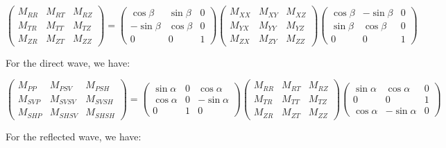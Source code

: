 \documentclass[workdone.tex]{subfiles}
\begin{document}
\begin{equation}
\begin{pmatrix}
M_{RR} & M_{RT} & M_{RZ} \\
M_{TR} & M_{TT} & M_{TZ} \\
M_{ZR} & M_{ZT} & M_{ZZ}
\end{pmatrix} = \begin{pmatrix}
\cos \beta & \sin \beta & 0 \\
- \sin \beta & \cos \beta & 0 \\
0 & 0 & 1
\end{pmatrix} \begin{pmatrix}
M_{XX} & M_{XY} & M_{XZ} \\
M_{YX} & M_{YY} & M_{YZ} \\
M_{ZX} & M_{ZY} & M_{ZZ}
\end{pmatrix} \begin{pmatrix}
\cos \beta & - \sin \beta & 0 \\
\sin \beta & \cos \beta & 0 \\
0 & 0 & 1
\end{pmatrix}
\end{equation}

For the direct wave, we have:

\begin{equation}
\begin{pmatrix}
M_{PP} & M_{PSV} & M_{PSH} \\
M_{SVP} & M_{SVSV} & M_{SVSH} \\
M_{SHP} & M_{SHSV} & M_{SHSH}
\end{pmatrix} = \begin{pmatrix}
\sin \alpha & 0 & \cos \alpha \\
\cos \alpha & 0 & - \sin \alpha \\
0 & 1 & 0
\end{pmatrix} \begin{pmatrix}
M_{RR} & M_{RT} & M_{RZ} \\
M_{TR} & M_{TT} & M_{TZ} \\
M_{ZR} & M_{ZT} & M_{ZZ}
\end{pmatrix} \begin{pmatrix}
\sin \alpha & \cos \alpha & 0 \\
0 & 0 & 1 \\
\cos \alpha & - \sin \alpha & 0
\end{pmatrix}
\end{equation}

For the reflected wave, we have:
\end{document}
